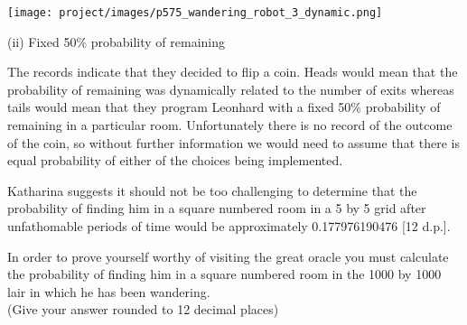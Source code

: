 \begin{center}
\texttt{[image: project/images/p575\_wandering\_robot\_3\_dynamic.png]}
\end{center}

(ii) Fixed 50\% probability of remaining

The records indicate that they decided to flip a coin. Heads would mean
that the probability of remaining was dynamically related to the number
of exits whereas tails would mean that they program Leonhard with a
fixed 50\% probability of remaining in a particular room. Unfortunately
there is no record of the outcome of the coin, so without further
information we would need to assume that there is equal probability of
either of the choices being implemented.

Katharina suggests it should not be too challenging to determine that
the probability of finding him in a square numbered room in a 5 by 5
grid after unfathomable periods of time would be approximately
0.177976190476 {[}12 d.p.{]}.

In order to prove yourself worthy of visiting the great oracle you must
calculate the probability of finding him in a square numbered room in
the 1000 by 1000 lair in which he has been wandering.\\
(Give your answer rounded to 12 decimal places)